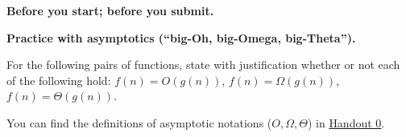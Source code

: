 \documentclass[11pt,addpoints]{exam}
\begin{document}
\listoffixmes

\hwpreface

\pointsinmargin
{}
\marginpointname{ \points}
\marginbonuspointname{ \bonuspoints}

\begin{questions}

  \addtocounter{question}{-1}
  \question[0] \textbf{Before you start; before you submit.}
  

  \question \textbf{Practice with asymptotics (``big-Oh, big-Omega, big-Theta'').}
  
  For the following pairs of functions, state with justification whether or not each of the following hold: $f(n) = O(g(n))$, $f(n) = \Omega(g(n))$, $f(n) = \Theta(g(n))$.

  You can find the definitions of asymptotic notations ($O, \Omega, \Theta$) in \href{https://drive.google.com/file/d/1F_6pnQxpaYiqpnue5pKDSYVMItf3PG-T/view?usp=drive_link}{Handout 0}.

\end{questions}
\end{document}
